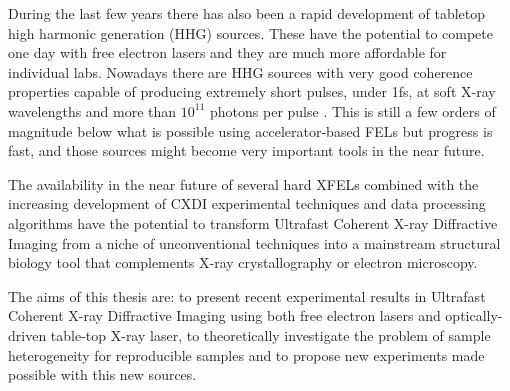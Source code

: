 During the last few years there has also been a rapid development of tabletop
high harmonic generation (HHG) sources. These have the potential to compete one
day with free electron lasers and they are much more affordable for
individual labs. Nowadays there are HHG sources with very good coherence
properties capable of producing extremely short pulses, under 1fs, at soft X-ray wavelengths and more than $10^{11}$ photons
per pulse \cite{Ravasio2009SingleShot}. This is still a few orders of magnitude below what is
possible using accelerator-based FELs but progress is fast, and those sources
might
become very important tools in the near future.

The availability in the near future of several hard XFELs combined with the
increasing development of CXDI experimental techniques and data processing
algorithms have the potential to transform Ultrafast Coherent X-ray Diffractive
Imaging from a niche of unconventional techniques into a mainstream structural
biology tool that complements X-ray crystallography or electron microscopy.


The aims of this thesis are: to present recent experimental results in Ultrafast
Coherent X-ray Diffractive Imaging using both free electron lasers and
optically-driven table-top X-ray laser, to theoretically investigate the problem of sample heterogeneity
for reproducible samples and to propose new experiments made possible with this
new sources.

